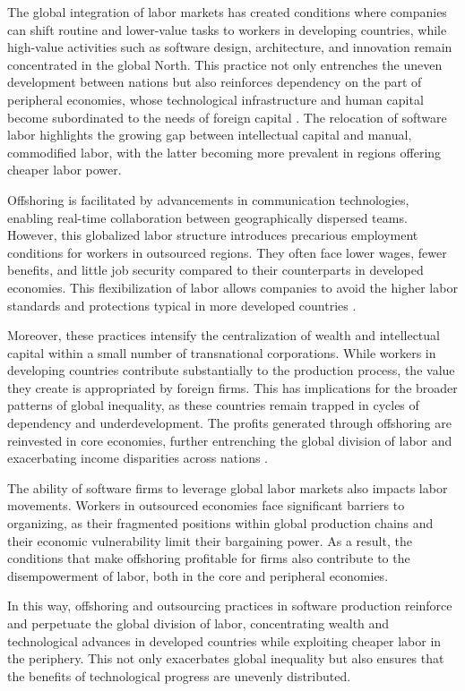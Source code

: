The global integration of labor markets has created conditions where companies can shift routine and lower-value tasks to workers in developing countries, while high-value activities such as software design, architecture, and innovation remain concentrated in the global North. This practice not only entrenches the uneven development between nations but also reinforces dependency on the part of peripheral economies, whose technological infrastructure and human capital become subordinated to the needs of foreign capital \cite[pp.~84-86]{mosco2009}. The relocation of software labor highlights the growing gap between intellectual capital and manual, commodified labor, with the latter becoming more prevalent in regions offering cheaper labor power.

Offshoring is facilitated by advancements in communication technologies, enabling real-time collaboration between geographically dispersed teams. However, this globalized labor structure introduces precarious employment conditions for workers in outsourced regions. They often face lower wages, fewer benefits, and little job security compared to their counterparts in developed economies. This flexibilization of labor allows companies to avoid the higher labor standards and protections typical in more developed countries \cite[pp.~124-127]{sassen2008}.

Moreover, these practices intensify the centralization of wealth and intellectual capital within a small number of transnational corporations. While workers in developing countries contribute substantially to the production process, the value they create is appropriated by foreign firms. This has implications for the broader patterns of global inequality, as these countries remain trapped in cycles of dependency and underdevelopment. The profits generated through offshoring are reinvested in core economies, further entrenching the global division of labor and exacerbating income disparities across nations \cite[pp.~89-91]{harvey2021}.

The ability of software firms to leverage global labor markets also impacts labor movements. Workers in outsourced economies face significant barriers to organizing, as their fragmented positions within global production chains and their economic vulnerability limit their bargaining power. As a result, the conditions that make offshoring profitable for firms also contribute to the disempowerment of labor, both in the core and peripheral economies.

In this way, offshoring and outsourcing practices in software production reinforce and perpetuate the global division of labor, concentrating wealth and technological advances in developed countries while exploiting cheaper labor in the periphery. This not only exacerbates global inequality but also ensures that the benefits of technological progress are unevenly distributed.

